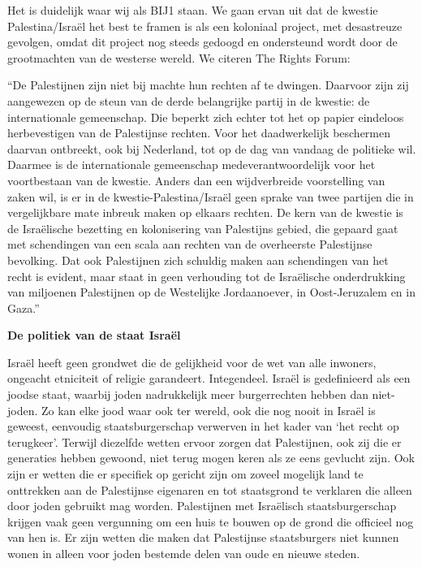 Het is duidelijk waar wij als BIJ1 staan. We gaan ervan uit dat de
kwestie Palestina/Israël het best te framen is als een koloniaal
project, met desastreuze gevolgen, omdat dit project nog steeds gedoogd
en ondersteund wordt door de grootmachten van de westerse wereld. We
citeren The Rights Forum:

``De Palestijnen zijn niet bij machte hun rechten af te dwingen.
Daarvoor zijn zij aangewezen op de steun van de derde belangrijke partij
in de kwestie: de internationale gemeenschap. Die beperkt zich echter
tot het op papier eindeloos herbevestigen van de Palestijnse rechten.
Voor het daadwerkelijk beschermen daarvan ontbreekt, ook bij Nederland,
tot op de dag van vandaag de politieke wil. Daarmee is de internationale
gemeenschap medeverantwoordelijk voor het voortbestaan van de kwestie.
Anders dan een wijdverbreide voorstelling van zaken wil, is er in de
kwestie-Palestina/Israël geen sprake van twee partijen die in
vergelijkbare mate inbreuk maken op elkaars rechten. De kern van de
kwestie is de Israëlische bezetting en kolonisering van Palestijns
gebied, die gepaard gaat met schendingen van een scala aan rechten van
de overheerste Palestijnse bevolking. Dat ook Palestijnen zich schuldig
maken aan schendingen van het recht is evident, maar staat in geen
verhouding tot de Israëlische onderdrukking van miljoenen Palestijnen op
de Westelijke Jordaanoever, in Oost-Jeruzalem en in Gaza.''

\textbf{De politiek van de staat Israël}

Israël heeft geen grondwet die de gelijkheid voor de wet van alle
inwoners, ongeacht etniciteit of religie garandeert. Integendeel. Israël
is gedefinieerd als een joodse staat, waarbij joden nadrukkelijk meer
burgerrechten hebben dan niet-joden. Zo kan elke jood waar ook ter
wereld, ook die nog nooit in Israël is geweest, eenvoudig
staatsburgerschap verwerven in het kader van `het recht op terugkeer'.
Terwijl diezelfde wetten ervoor zorgen dat Palestijnen, ook zij die er
generaties hebben gewoond, niet terug mogen keren als ze eens gevlucht
zijn. Ook zijn er wetten die er specifiek op gericht zijn om zoveel
mogelijk land te onttrekken aan de Palestijnse eigenaren en tot
staatsgrond te verklaren die alleen door joden gebruikt mag worden.
Palestijnen met Israëlisch staatsburgerschap krijgen vaak geen
vergunning om een huis te bouwen op de grond die officieel nog van hen
is. Er zijn wetten die maken dat Palestijnse staatsburgers niet kunnen
wonen in alleen voor joden bestemde delen van oude en nieuwe steden.

